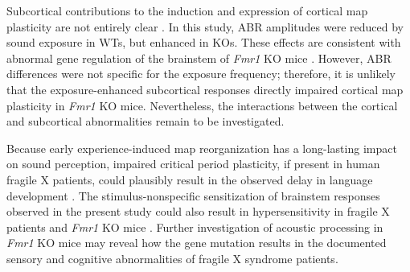 Subcortical contributions to the induction and expression of cortical map plasticity are not entirely clear \cite{Barkat2011, Oliver2011, Miyakawa2013}. In this study, ABR amplitudes were reduced by sound exposure in WTs, but enhanced in KOs. These effects are consistent with abnormal gene regulation of the brainstem of \textit{Fmr1} KO mice \cite{Strumbos2010}. However, ABR differences were not specific for the exposure frequency; therefore, it is unlikely that the exposure-enhanced subcortical responses directly impaired cortical map plasticity in \textit{Fmr1} KO mice. Nevertheless, the interactions between the cortical and subcortical abnormalities remain to be investigated.

Because early experience-induced map reorganization has a long-lasting impact on sound perception, impaired critical period plasticity, if present in human fragile X patients, could plausibly result in the observed delay in language development \cite{Finestack2009}. The stimulus-nonspecific sensitization of brainstem responses observed in the present study could also result in hypersensitivity in fragile X patients and \textit{Fmr1} KO mice \cite{Miller1999, Chen2001, Nielsen2002, Tsiouris2004}. Further investigation of acoustic processing in \textit{Fmr1} KO mice may reveal how the gene mutation results in the documented sensory and cognitive abnormalities of fragile X syndrome patients.

\printbibliography